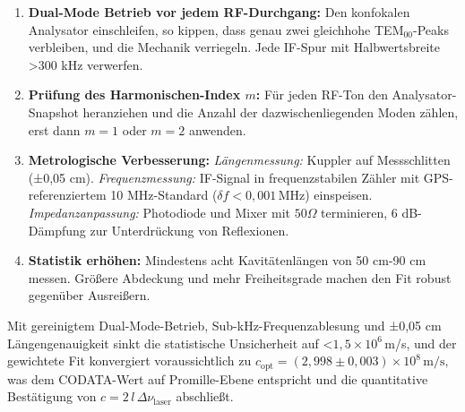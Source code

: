 \begin{enumerate}
  \item \textbf{Dual-Mode Betrieb vor jedem RF-Durchgang:}  
    Den konfokalen Analysator einschleifen, so kippen, dass genau zwei gleichhohe TEM\(_{00}\)-Peaks verbleiben, und die Mechanik verriegeln. Jede IF-Spur mit Halbwertsbreite >300 kHz verwerfen.

  \item \textbf{Prüfung des Harmonischen-Index \(m\):}  
    Für jeden RF-Ton den Analysator-Snapshot heranziehen und die Anzahl der dazwischenliegenden Moden zählen, erst dann \(m=1\) oder \(m=2\) anwenden.

  \item \textbf{Metrologische Verbesserung:}  
    \emph{Längenmessung:} Kuppler auf Messschlitten (±0{,}05 cm).  
    \emph{Frequenzmessung:} IF-Signal in frequenzstabilen Zähler mit GPS-referenziertem 10 MHz-Standard (\(\delta f<0{,}001\)\,MHz) einspeisen.  
    \emph{Impedanzanpassung:} Photodiode und Mixer mit $50 \Omega$ terminieren, 6 dB-Dämpfung zur Unterdrückung von Reflexionen.

  \item \textbf{Statistik erhöhen:}  
    Mindestens acht Kavitätenlängen von 50 cm-90 cm messen. Größere Abdeckung und mehr Freiheitsgrade machen den Fit robust gegenüber Ausreißern.
\end{enumerate}

Mit gereinigtem Dual-Mode-Betrieb, Sub-kHz-Frequenzablesung und ±0{,}05 cm Längengenauigkeit sinkt die statistische Unsicherheit auf <\(1{,}5\times10^6\)\,m/s, und der gewichtete Fit konvergiert voraussichtlich zu  
$
  c_{\mathrm{opt}} = (2{,}998 \pm 0{,}003)\times10^{8}\,\mathrm{m/s},
$ 
was dem CODATA-Wert auf Promille-Ebene entspricht und die quantitative Bestätigung von \(c = 2\,l\,\Delta\nu_{\mathrm{laser}}\) abschließt.
